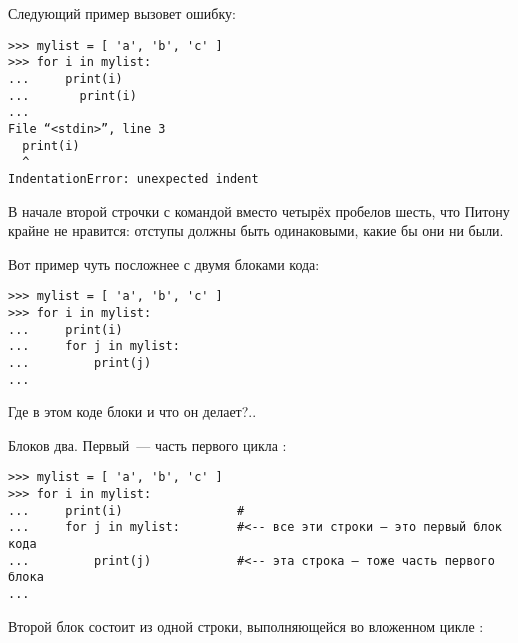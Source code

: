 Следующий пример вызовет ошибку:

\begin{listing}
\begin{verbatim}
>>> mylist = [ 'a', 'b', 'c' ]
>>> for i in mylist:
...     print(i)
...       print(i)
...
File “<stdin>”, line 3
  print(i)
  ^
IndentationError: unexpected indent
\end{verbatim}
\end{listing}

В начале второй строчки с командой  вместо четырёх пробелов шесть, что Питону крайне не нравится: отступы должны быть одинаковыми, какие бы они ни были.


Вот пример чуть посложнее с двумя блоками кода:

\begin{listing}
\begin{verbatim}
>>> mylist = [ 'a', 'b', 'c' ]
>>> for i in mylist:
...     print(i)
...     for j in mylist:
...         print(j)
...
\end{verbatim}
\end{listing}

Где в этом коде блоки и что он делает?..

Блоков два. Первый — часть первого цикла :

\begin{listing}
\begin{verbatim}
>>> mylist = [ 'a', 'b', 'c' ]
>>> for i in mylist:
...     print(i)                #
...     for j in mylist:        #<-- все эти строки — это первый блок кода
...         print(j)            #<-- эта строка — тоже часть первого блока
...
\end{verbatim}
\end{listing}

Второй блок состоит из одной строки, выполняющейся во вложенном цикле :

